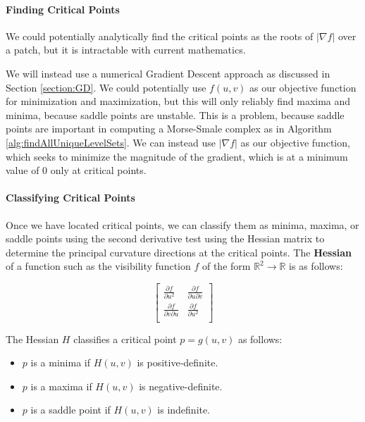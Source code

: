 \documentclass[12pt, letterpaper]{article}
\begin{document}
		\paragraph{Finding Critical Points}

		We could potentially analytically find the critical points as the roots of $|\nabla f|$ over a patch, but it is intractable with current mathematics.

		We will instead use a numerical Gradient Descent approach as discussed in Section \ref{section:GD}. We could potentially use $f(u, v)$ as our objective function for minimization and maximization,
		but this will only reliably find maxima and minima, because saddle points are unstable. This is a problem, because saddle points are important in computing a Morse-Smale complex
		as in Algorithm \ref{alg:findAllUniqueLevelSets}. We can instead use $|\nabla f|$ as our objective function,
		which seeks to minimize the magnitude of the gradient, which is at a minimum value of 0 only at critical points.
	
		\paragraph{Classifying Critical Points}

		Once we have located critical points, we can classify them as minima, maxima, or saddle points using the second derivative test using the
		Hessian matrix to determine the principal curvature directions at the critical points.
		The \textbf{Hessian} of a function such as the visibility function $f$ of the form $\mathbb{R}^{2} \rightarrow \mathbb{R}$ is as follows:

		\[
		\begin{bmatrix}
		\frac{\partial f}{\partial u^{2}} & \frac{\partial f}{\partial u \partial v} \\
		\frac{\partial f}{\partial v \partial u} & \frac{\partial f}{\partial u^{2}} \\
		\end{bmatrix}
		\]

		The Hessian $H$ classifies a critical point $p = g(u, v)$ as follows:

		\begin{itemize}
		\item $p$ is a minima if $H(u, v)$ is positive-definite. \\
		\item $p$ is a maxima if $H(u, v)$ is negative-definite.\\
		\item $p$ is a saddle point if $H(u, v)$ is indefinite.\\
		\end{itemize}
\end{document}
